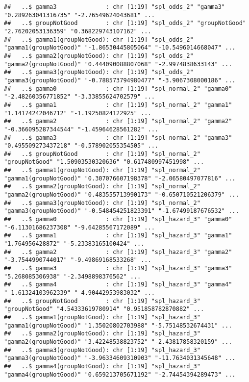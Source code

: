 \documentclass[
]{article}
\begin{document}
\begin{verbatim}
##   ..$ gamma3              : chr [1:19] "spl_odds_2" "gamma3" "0.289263041316735" "-2.76549624043681" ...
##   ..$ groupNotGood        : chr [1:19] "spl_odds_2" "groupNotGood" "2.76202053136359" "0.368229743107162" ...
##   ..$ gamma1(groupNotGood): chr [1:19] "spl_odds_2" "gamma1(groupNotGood)" "-1.86530445805064" "-10.5496014668047" ...
##   ..$ gamma2(groupNotGood): chr [1:19] "spl_odds_2" "gamma2(groupNotGood)" "0.444090088807068" "-2.9974838633143" ...
##   ..$ gamma3(groupNotGood): chr [1:19] "spl_odds_2" "gamma3(groupNotGood)" "-0.788573794980477" "-3.9067308000186" ...
##   ..$ gamma0              : chr [1:19] "spl_normal_2" "gamma0" "-2.48260356771852" "-3.33855624702579" ...
##   ..$ gamma1              : chr [1:19] "spl_normal_2" "gamma1" "1.14174242046712" "-1.19250824122925" ...
##   ..$ gamma2              : chr [1:19] "spl_normal_2" "gamma2" "-0.366095287344544" "-1.45964628561282" ...
##   ..$ gamma3              : chr [1:19] "spl_normal_2" "gamma3" "0.495509273437218" "-0.578902055354505" ...
##   ..$ groupNotGood        : chr [1:19] "spl_normal_2" "groupNotGood" "1.50903530320636" "0.617480997451998" ...
##   ..$ gamma1(groupNotGood): chr [1:19] "spl_normal_2" "gamma1(groupNotGood)" "0.307076607198378" "-2.06580497077816" ...
##   ..$ gamma2(groupNotGood): chr [1:19] "spl_normal_2" "gamma2(groupNotGood)" "0.483555713990173" "-0.650710521206379" ...
##   ..$ gamma3(groupNotGood): chr [1:19] "spl_normal_2" "gamma3(groupNotGood)" "-0.548454251823391" "-1.67499187676532" ...
##   ..$ gamma0              : chr [1:19] "spl_hazard_3" "gamma0" "-6.11301686237308" "-9.64285567172089" ...
##   ..$ gamma1              : chr [1:19] "spl_hazard_3" "gamma1" "1.764956428872" "-5.23383165100424" ...
##   ..$ gamma2              : chr [1:19] "spl_hazard_3" "gamma2" "-3.7544990744017" "-9.49869168533268" ...
##   ..$ gamma3              : chr [1:19] "spl_hazard_3" "gamma3" "5.268085306938" "-2.3498898376562" ...
##   ..$ gamma4              : chr [1:19] "spl_hazard_3" "gamma4" "-1.61324103962339" "-4.90442953983032" ...
##   ..$ groupNotGood        : chr [1:19] "spl_hazard_3" "groupNotGood" "4.54333619780914" "0.951858782870882" ...
##   ..$ gamma1(groupNotGood): chr [1:19] "spl_hazard_3" "gamma1(groupNotGood)" "1.35020802703988" "-5.75148532674431" ...
##   ..$ gamma2(groupNotGood): chr [1:19] "spl_hazard_3" "gamma2(groupNotGood)" "3.42248538823752" "-2.43817858320159" ...
##   ..$ gamma3(groupNotGood): chr [1:19] "spl_hazard_3" "gamma3(groupNotGood)" "-3.96334609310903" "-11.7634031345648" ...
##   ..$ gamma4(groupNotGood): chr [1:19] "spl_hazard_3" "gamma4(groupNotGood)" "0.659213705671192" "-2.74454394289473" ...

\end{verbatim}
\end{document}
